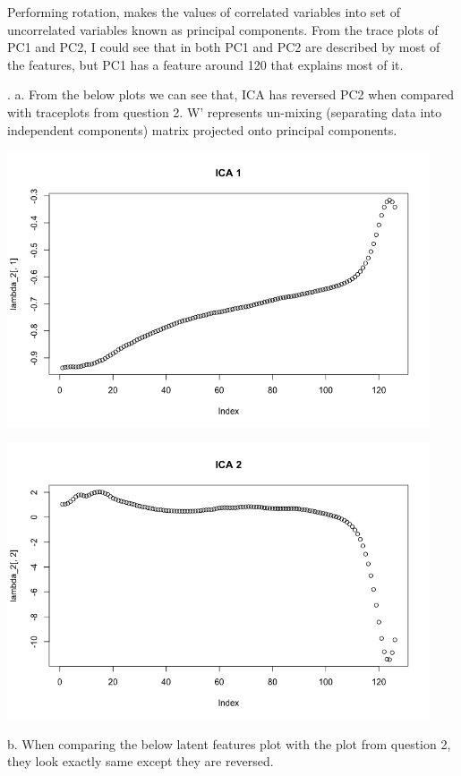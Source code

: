 \documentclass[a4paper,10pt]{article}
\begin{document}
Performing rotation, makes the values of correlated variables into set of uncorrelated variables known as principal components.
From the trace plots of PC1 and PC2, I could see that in both PC1 and PC2 are described by most of the features, but PC1 has a feature around 120 that explains most of it. \par
{}. a. From the below plots we can see that, ICA has reversed PC2 when compared with traceplots from question 2. W' represents un-mixing (separating data into independent components) matrix
projected onto principal components. \par
\begin{center}
  \includegraphics[width=125mm,scale=0.10]{Latent_Features_1_Traceplot.png} \par
  \includegraphics[width=125mm,scale=0.10]{Latent_Features_2_Traceplot.png}
\end{center} \par
\newpage
b. When comparing the below latent features plot with the plot from question 2, they look exactly same except they are reversed.
\end{document}
